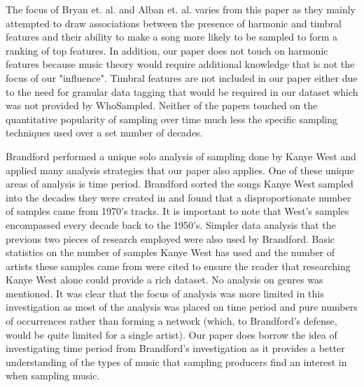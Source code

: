 \documentclass[pageno]{jpaper}
\begin{document}
The focus of Bryan et. al. and Alban et. al. varies from this paper as they mainly attempted to draw associations between the presence of harmonic and timbral features and their ability to make a song more likely to be sampled to form a ranking of top features. In addition, our paper does not touch on harmonic features because music theory would require additional knowledge that is not the focus of our "influence". Timbral features are not included in our paper either due to the need for granular data tagging that would be required in our dataset which was not provided by WhoSampled. Neither of the papers touched on the quantitative popularity of sampling over time much less the specific sampling techniques used over a set number of decades.

Brandford performed a unique solo analysis of sampling done by Kanye West and applied many analysis strategies that our paper also applies. \cite{Brandford} One of these unique areas of analysis is time period. Brandford sorted the songs Kanye West sampled into the decades they were created in and found that a disproportionate number of samples came from 1970's tracks. It is important to note that West's samples encompassed every decade back to the 1950's. Simpler data analysis that the previous two pieces of research employed were also used by Brandford. Basic statistics on the number of samples Kanye West has used and the number of artists these samples came from were cited to ensure the reader that researching Kanye West alone could provide a rich dataset. No analysis on genres was mentioned. It was clear that the focus of analysis was more limited in this investigation as most of the analysis was placed on time period and pure numbers of occurrences rather than forming a network (which, to Brandford's defense, would be quite limited for a single artist). Our paper does borrow the idea of investigating time period from Brandford's investigation as it provides a better understanding of the types of music that sampling producers find an interest in when sampling music. 
\end{document}
